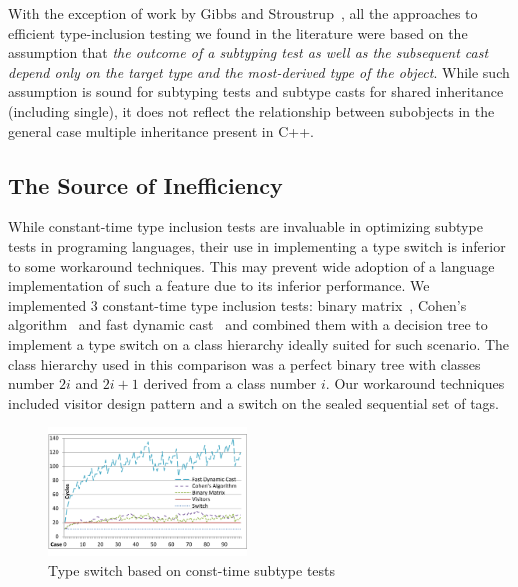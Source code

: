 With the exception of work by Gibbs and Stroustrup~\cite{FastDynCast}, all the 
approaches to efficient type-inclusion testing we found in the literature were 
based on the assumption that \emph{the outcome of a subtyping test as well as 
the subsequent cast depend only on the target type and the most-derived type of 
the object}. While such assumption is sound for subtyping tests and subtype 
casts for shared inheritance (including single), it does not reflect the 
relationship between subobjects in the general case multiple inheritance present 
in C++.

\subsection{The Source of Inefficiency}

While constant-time type inclusion tests are invaluable in optimizing subtype 
tests in programing languages, their use in implementing a type switch is 
inferior to some workaround techniques. This may prevent wide adoption of a 
language implementation of such a feature due to its inferior performance. 
We implemented 3 constant-time type inclusion tests: binary 
matrix~\cite{Vitek97}, Cohen's algorithm~\cite{Cohen91} and fast dynamic 
cast~\cite{FastDynCast} and combined them with a decision tree to implement a 
type switch on a class hierarchy ideally suited for such scenario.  
The class hierarchy used in this comparison was a perfect binary tree with 
classes number $2i$ and $2i+1$ derived from a class number $i$. Our workaround 
techniques included visitor design pattern and a switch on the sealed sequential 
set of tags.

\begin{figure}[htbp]
  \centering
    \includegraphics[width=0.47\textwidth]{DCast-vs-Visitors.pdf}
  \caption{Type switch based on const-time subtype tests}
  \label{fig:DCastVis2}
\end{figure}

